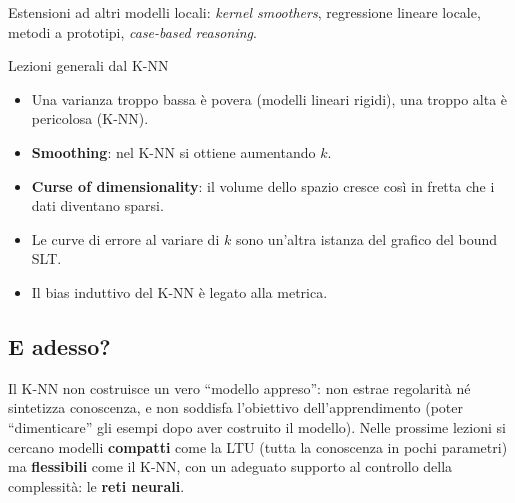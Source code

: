 Estensioni ad altri modelli locali: \emph{kernel smoothers}, regressione
lineare locale, metodi a prototipi, \emph{case-based reasoning}.

\begin{boxabstract}{Lezioni generali dal K-NN}

\begin{itemize}
\tightlist
\item
  Una varianza troppo bassa è povera (modelli lineari rigidi), una
  troppo alta è pericolosa (K-NN).
\item
  \textbf{Smoothing}: nel K-NN si ottiene aumentando \(k\).
\item
  \textbf{Curse of dimensionality}: il volume dello spazio cresce così
  in fretta che i dati diventano sparsi.
\item
  Le curve di errore al variare di \(k\) sono un'altra istanza del
  grafico del bound SLT.
\item
  Il bias induttivo del K-NN è legato alla metrica.
\end{itemize}

\end{boxabstract}

\subsection{E adesso?}\label{e-adesso}

Il K-NN non costruisce un vero ``modello appreso'': non estrae
regolarità né sintetizza conoscenza, e non soddisfa l'obiettivo
dell'apprendimento (poter ``dimenticare'' gli esempi dopo aver costruito
il modello). Nelle prossime lezioni si cercano modelli \textbf{compatti}
come la LTU (tutta la conoscenza in pochi parametri) ma
\textbf{flessibili} come il K-NN, con un adeguato supporto al controllo
della complessità: le \textbf{reti neurali}.

